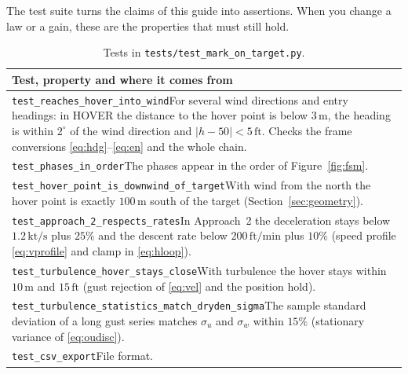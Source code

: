 \documentclass[11pt,a4paper]{article}
\newcommand{\code}[1]{\texttt{#1}}
\newcommand{\un}[1]{\,\mathrm{#1}}
\begin{document}
The test suite turns the claims of this guide into assertions. When you change
a law or a gain, these are the properties that must still hold.

\begin{table}[H]
\centering\small
\begin{tabular}{@{}p{14.4cm}@{}}
\toprule
Test, property and where it comes from \\
\midrule
\code{test\_reaches\_hover\_into\_wind}\newline For several wind directions and entry
headings: in HOVER the distance to the hover point is below $3\un{m}$, the
heading is within $2^\circ$ of the wind direction and $|h-50|<5\un{ft}$.
Checks the frame conversions \eqref{eq:hdg}--\eqref{eq:en} and the whole chain. \\[0.3em]
\code{test\_phases\_in\_order}\newline The phases appear in the order of
Figure~\ref{fig:fsm}. \\[0.3em]
\code{test\_hover\_point\_is\_downwind\_of\_target}\newline With wind from the north
the hover point is exactly $100\un{m}$ south of the target
(Section~\ref{sec:geometry}). \\[0.3em]
\code{test\_approach\_2\_respects\_rates}\newline In Approach~2 the deceleration
stays below $1.2\un{kt/s}$ plus $25\%$ and the descent rate below
$200\un{ft/min}$ plus $10\%$ (speed profile \eqref{eq:vprofile} and clamp in
\eqref{eq:hloop}). \\[0.3em]
\code{test\_turbulence\_hover\_stays\_close}\newline With turbulence the hover stays
within $10\un{m}$ and $15\un{ft}$ (gust rejection of \eqref{eq:vel} and the
position hold). \\[0.3em]
\code{test\_turbulence\_statistics\_match\_dryden\_sigma}\newline The sample standard
deviation of a long gust series matches $\sigma_u$ and $\sigma_w$ within
$15\%$ (stationary variance of \eqref{eq:oudisc}). \\[0.3em]
\code{test\_csv\_export}\newline File format. \\
\bottomrule
\end{tabular}
\caption{Tests in \code{tests/test\_mark\_on\_target.py}.}
\end{table}

\end{document}
